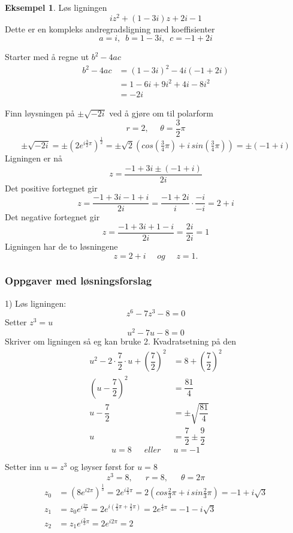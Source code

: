 \documentclass[11pt]{article}
\theoremstyle{definition}
\theoremstyle{definition}
\newtheorem{mitteks}{Eksempel}[section]
\theoremstyle{definition}
\theoremstyle{definition}
\theoremstyle{definition}
\theoremstyle{definition}
\begin{document}
		\begin{mitteks}
			Løs ligningen \[iz^2+(1-3i)z+2i-1\]
			Dette er en kompleks andregradsligning med koeffisienter \[a=i,\,\,\, b=1-3i, \,\,\, c=-1+2i \]
			
			Starter med å regne ut \(b^2-4ac\)
			\begin{align*}
			b^2-4ac&=(1-3i)^2-4i(-1+2i) \\
			&=1-6i+9i^2+4i-8i^2         \\
			&=-2i
			\end{align*}
			
			Finn løysningen på \(\pm\sqrt{-2i} \) ved å gjøre om til polarform
			\[r=2, \hspace{16pt} \theta=\frac{3}{2}\pi \]		
			\[\pm\sqrt{-2i} =\pm (2e^{i\frac{3}{2}\pi})^{\frac{1}{2}}=\pm \sqrt{2}(cos(\tfrac{3}{4}\pi)+i\, sin(\tfrac{3}{4}\pi))=\pm (-1+i)  \]
			Ligningen er nå \[z=\dfrac{-1+3i \pm (-1+i)}{2i}\]
			Det positive fortegnet gir
			\[z=\dfrac{-1+3i-1+i}{2i}=\dfrac{-1+2i}{i}\cdot \dfrac{-i}{-i}=2+i \]
			Det negative fortegnet gir
			 \[z=\dfrac{-1+3i+1-i}{2i}=\dfrac{2i}{2i}=1\]
			 Ligningen har de to løsningene 
			 \[z=2+i\hspace{16pt}og\hspace{16pt}
			 z=1. \]
		\end{mitteks}
		
		\newpage
		
		\subsubsection{Oppgaver med løsningsforslag}
		
		1) Løs ligningen: \[z^6-7z^3-8=0\]
		Setter \(z^3=u\)
		\[u^2-7u-8=0\]
		Skriver om ligningen så eg kan bruke 2. Kvadratsetning på den
		\begin{align*}
			u^2-2\cdot \dfrac{7}{2}\cdot u + \left( \dfrac{7}{2} \right)^2&=8+ \left( \dfrac{7}{2} \right)^2 \\
			\left(u-\dfrac{7}{2}\right)^2&=\dfrac{81}{4} \\
			u-\dfrac{7}{2}&=\pm \sqrt{\dfrac{81}{4}} \\
			u&=\dfrac{7}{2}\pm \dfrac{9}{2}
		\end{align*}
		\[u=8 \hspace{18pt} eller \hspace{18pt}u=-1\]
		
		Setter inn \(u=z^3\) og løyser først for \(u=8\)
		\[z^3=8, \hspace{18pt} r=8, \hspace{18pt} \theta=2\pi \]
		\begin{align*}
			z_0&=(8e^{i2\pi})^{\frac{1}{3}}=2e^{i\frac{2}{3}\pi}=2(cos\tfrac{2}{3}\pi+i\, sin\tfrac{2}{3}\pi)=-1+i\sqrt{3} \\
			z_1&=z_0e^{i\frac{2\pi}{3}}=2e^{i(\frac{2}{3}\pi+\frac{2}{3}\pi)}=2e^{\frac{4}{3}\pi}=-1-i\sqrt{3} \\
			z_2&=z_1e^{i\frac{2}{3}\pi}=2e^{i2\pi}=2
		\end{align*}
		
\end{document}
